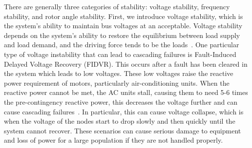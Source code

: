 There are generally three categories of stability: voltage stability, frequency stability, and rotor angle stability.  First, we introduce voltage stability, which is the system's ability to maintain bus voltages at an acceptable.  Voltage stability depends on the system's ability to restore the equilibrium between load supply and load demand, and the driving force tends to be the loads~\cite{volt_stab}.  One particular type of voltage instability that can lead to cascading failures is Fault-Induced Delayed Voltage Recovery (FIDVR).  This occurs after a fault has been cleared in the system which leads to low voltages.  These low voltages raise the reactive power requirement of motors, particularly air-conditioning units.  When the reactive power cannot be met, the AC units stall, causing them to need 5-6 times the pre-contingency reactive power, this decreases the voltage further and can cause cascading failures~\cite{fidvr_nerc}.  In particular, this can cause voltage collapse, which is when the voltage of the nodes start to drop slowly and then quickly until the system cannot recover.  These scenarios can cause serious damage to equipment and loss of power for a large population if they are not handled properly.

